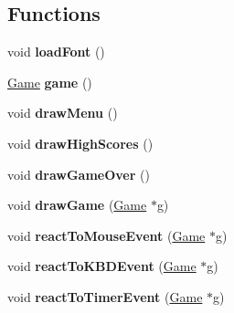 \subsection*{Functions}
\begin{DoxyCompactItemize}
\item 
\mbox{\label{group__Game_ga510a22fb3bd800dc653c26722e80cb1e}} 
void {\bfseries load\+Font} ()
\item 
\mbox{\label{group__Game_gae94969e6ac665afe12c03e944665ebbb}} 
\hyperlink{structgame__t}{Game} {\bfseries game} ()
\item 
\mbox{\label{group__Game_gaa13653318c21b0e6b86838e6091bfc9a}} 
void {\bfseries draw\+Menu} ()
\item 
\mbox{\label{group__Game_gac0bfe538bd1a0716693118520fceff6d}} 
void {\bfseries draw\+High\+Scores} ()
\item 
\mbox{\label{group__Game_gaeb2c7e9c7d14c9eccb7e624bd9611ef8}} 
void {\bfseries draw\+Game\+Over} ()
\item 
\mbox{\label{group__Game_ga948e36b9a2d94457ba4fe5db60597132}} 
void {\bfseries draw\+Game} (\hyperlink{structgame__t}{Game} $\ast$g)
\item 
\mbox{\label{group__Game_ga9a264889f86e1b2ce50f64cd2a71f62e}} 
void {\bfseries react\+To\+Mouse\+Event} (\hyperlink{structgame__t}{Game} $\ast$g)
\item 
\mbox{\label{group__Game_gaecf7fcfb8c4d859c092b076243144745}} 
void {\bfseries react\+To\+K\+B\+D\+Event} (\hyperlink{structgame__t}{Game} $\ast$g)
\item 
\mbox{\label{group__Game_ga6cd9476bb3d97ac3b7e53461070d2c8f}} 
void {\bfseries react\+To\+Timer\+Event} (\hyperlink{structgame__t}{Game} $\ast$g)
\end{DoxyCompactItemize}
